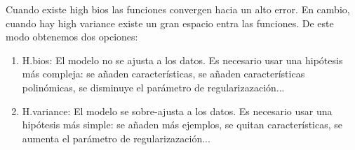 \documentclass[12pt,a4paper]{article}
\begin{document}
Cuando existe high bios las funciones convergen hacia un alto error. En cambio, cuando hay high variance existe un gran espacio entra las funciones. De este modo obtenemos dos opciones:
\begin{enumerate}
\item H.bios: El modelo no se ajusta a los datos. Es necesario usar una hipótesis más compleja: se añaden características, se añaden características polinómicas, se disminuye el parámetro de regularizazación...
\item H.variance: El modelo se sobre-ajusta a los datos. Es necesario usar una hipótesis más simple: se añaden más ejemplos, se quitan características, se aumenta el parámetro de regularizazación...
\end{enumerate}



\newpage
\end{document}
